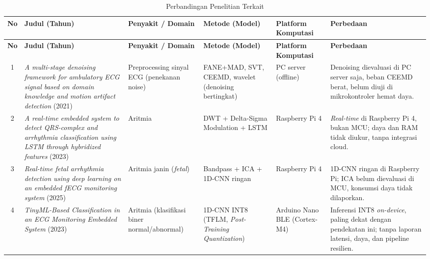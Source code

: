 {\scriptsize
\setlength{\tabcolsep}{3pt}
\renewcommand{\arraystretch}{1.2}
\begin{longtable}{|c|L{3.5cm}|L{2.0cm}|L{2.0cm}|L{1.8cm}|L{2.8cm}|}
\caption{Perbandingan Penelitian Terkait}\label{tab:perbandingan-penelitian}\\
\hline
{}
\textbf{No} & \textbf{Judul (Tahun)} & \textbf{Penyakit / Domain} & \textbf{Metode (Model)} & \textbf{Platform Komputasi} & \textbf{Perbedaan} \\ \hline
\endfirsthead

\hline
{}
\textbf{No} & \textbf{Judul (Tahun)} & \textbf{Penyakit / Domain} & \textbf{Metode (Model)} & \textbf{Platform Komputasi} & \textbf{Perbedaan} \\ \hline
\endhead

\hline
\endfoot

\hline
\endlastfoot

1 & \textit{A multi-stage denoising framework for ambulatory ECG signal based on domain knowledge and motion artifact detection} (2021) & Preprocessing sinyal ECG (penekanan noise) & FANE+MAD, SVT, CEEMD, wavelet (denoising bertingkat) & PC server (offline) & Denoising dievaluasi di PC server saja, beban CEEMD berat, belum diuji di mikrokontroler hemat daya. \\ \hline

2 & \textit{A real-time embedded system to detect QRS-complex and arrhythmia classification using LSTM through hybridized features} (2023) & Aritmia & DWT + Delta-Sigma Modulation + LSTM & Raspberry Pi 4 & \textit{Real-time} di Raspberry Pi 4, bukan MCU; daya dan RAM tidak diukur, tanpa integrasi cloud. \\ \hline

3 & \textit{Real-time fetal arrhythmia detection using deep learning on an embedded fECG monitoring system} (2025) & Aritmia janin (\textit{fetal}) & Bandpass + ICA + 1D-CNN ringan & Raspberry Pi 4 & 1D-CNN ringan di Raspberry Pi; ICA belum dievaluasi di MCU, konsumsi daya tidak dilaporkan. \\ \hline

4 & \textit{TinyML-Based Classification in an ECG Monitoring Embedded System} (2023) & Aritmia (klasifikasi biner normal/\allowbreak abnormal) & 1D-CNN INT8 (TFLM, \textit{Post-Training Quantization}) & Arduino Nano BLE (Cortex-M4) & Inferensi INT8 \textit{on-device}, paling dekat dengan pendekatan ini; tanpa laporan latensi, daya, dan pipeline resilien. \\ \hline


\end{longtable}}
